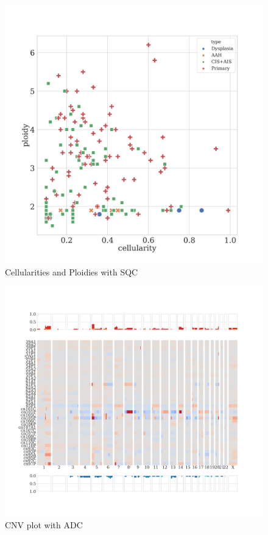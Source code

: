 \documentclass[a4paper]{article}
\begin{document}
            \begin{figure}[htbp]
                \centering
                \includegraphics[width=0.6 \linewidth]{figures/Sequenza/BWA-sequenza-SQC.pdf}
                \caption{Cellularities and Ploidies with SQC}
                \label{fig:sequenza-SQC}
            \end{figure}

            \begin{figure}[htbp]
                \centering
                \includegraphics[width=\linewidth]{figures/Sequenza/BWA-genome-ADC.pdf}
                \caption{CNV plot with ADC}
                \label{fig:CNV-ADC}
            \end{figure}
\end{document}
